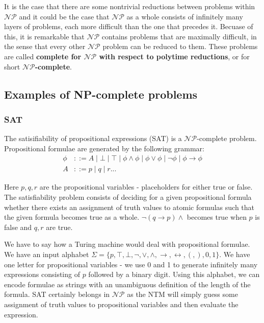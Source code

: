 \documentclass[11pt]{article}
\begin{document}
	\par 
	It is the case that there are some nontrivial reductions between problems within $\mathcal{NP}$ and it could be the case that $\mathcal{NP}$ as a whole consists of infinitely many layers of problems, each more difficult than the one that precedes it. Becuase of this, it is remarkable that $\mathcal{NP}$ contains problems that are maximally difficult, in the sense that every other $\mathcal{NP}$ problem can be reduced to them. These problems are called \textbf{complete for $\mathcal{NP}$ with respect to polytime reductions}, or for short \textbf{$\mathcal{NP}$-complete}.
	
	
	\subsection{Examples of NP-complete problems}
	\subsubsection{SAT}
	The satisifiability of propositional expressions (SAT) is a $\mathcal{NP}$-complete problem. Propositional formulae are generated by the following grammar:
	\begin{align*}
	\phi &::= A \;| \; \bot \;|\; \top \;|\; \phi \wedge \phi \;|\; \phi \vee \phi \;|\; \neg \phi \;|\; \phi \rightarrow \phi \\
	A &::= p \;|\;q \;| \; r ...
	\end{align*}
	
	Here $p, q, r$ are the propositional variables - placeholders for either true or false. The satisfiability problem consists of deciding for a given propositional formula whether there exists an assignment of truth values to atomic formulas such that the given formula becomes true as a whole. $\neg(q \rightarrow p) \wedge $ becomes true when $p$ is false and $q, r$ are true. 
	
	\par 
	We have to say how a Turing machine would deal with propositional formulae. We have an input alphabet $\Sigma = \{p, \top, \bot, \neg, \vee, \wedge, \rightarrow, \leftrightarrow, \left(, \right), 0, 1\}$. We have one letter for propositional variables - we use 0 and 1 to generate infinitely many expressions consisting of $p$ followed by a binary digit. Using this alphabet, we can encode formulae as strings with an unambiguous definition of the length of the formula. SAT certainly belongs in $\mathcal{NP}$ as the NTM will simply guess some assignment of truth values to propositional variables and then evaluate the expression.
	
\end{document}
